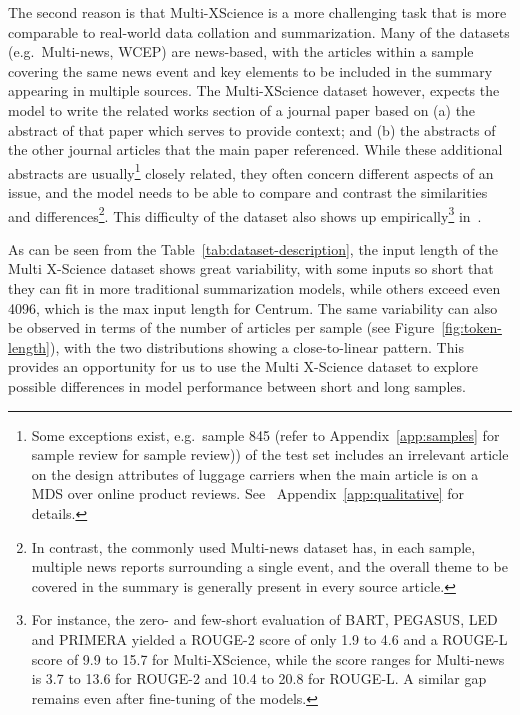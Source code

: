 \documentclass[12pt, twocolumn]{article}
\numberwithin{equation}{section}
\begin{document}
The second reason is that Multi-XScience is a more challenging task that is more comparable to real-world data collation and summarization.   Many of the datasets (e.g.~Multi-news, WCEP) are news-based, with the articles within a sample covering the same news event and key elements to be included in the summary appearing in multiple sources.  The Multi-XScience dataset however, expects the model to write the related works section of a journal paper based on (a) the abstract of that paper which serves to provide context; and (b) the abstracts of the other journal articles that the main paper referenced.  While these additional abstracts are usually\footnote{Some exceptions exist, e.g.~sample 845 (refer to Appendix~\ref{app:samples} for sample review for sample review)) of the test set includes an irrelevant article on the design attributes of luggage carriers when the main article is on a MDS over online product reviews.  See ~Appendix~\ref{app:qualitative} for details.} closely related, they often concern different aspects of an issue, and the model needs to be able to compare and contrast the similarities and differences\footnote{In contrast, the commonly used Multi-news dataset has, in each sample, multiple news reports surrounding a single event, and the overall theme to be covered in the summary is generally present in every source article.}.  This difficulty of the dataset also shows up empirically\footnote{For instance, the zero- and few-short evaluation of BART, PEGASUS, LED and PRIMERA yielded a ROUGE-2 score of only 1.9 to 4.6 and a ROUGE-L score of 9.9 to 15.7 for Multi-XScience, while the score ranges for Multi-news is 3.7 to 13.6 for ROUGE-2 and 10.4 to 20.8 for ROUGE-L.  A similar gap remains even after fine-tuning of the models.} in~\cite{xiao2022primera}.

As can be seen from the Table~\ref{tab:dataset-description}, the input length of the Multi X-Science dataset shows great variability, with some inputs so short that they can fit in more traditional summarization models, while others exceed even 4096, which is the max input length for Centrum.  The same variability can also be observed in terms of the number of articles per sample (see Figure~\ref{fig:token-length}), with the two distributions showing a close-to-linear pattern.  This provides an opportunity for us to use the Multi X-Science dataset to explore possible differences in model performance between short and long samples. 
\end{document}
